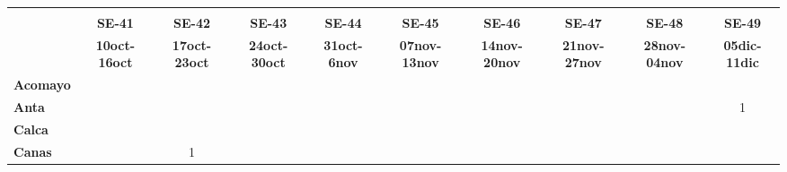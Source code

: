 \begin{tabular}{lccccccccc}
	\textbf{}              & \multicolumn{1}{l}{}                        & \multicolumn{1}{l}{}      & \multicolumn{1}{l}{}                         & \multicolumn{1}{l}{}                         & \multicolumn{1}{l}{}                         & \multicolumn{1}{l}{}                        & \multicolumn{1}{l}{}                         & \multicolumn{1}{l}{}                         & \multicolumn{1}{l}{}     \\
	\textbf{}                                                                                 
	&\textbf{SE-41}                              &\textbf{SE-42}                   &\textbf{SE-43}                  
	&\textbf{SE-44} 
	&\textbf{SE-45} 							&\textbf{SE-46} 
	&\textbf{SE-47}								&\textbf{SE-48}  				  &\textbf{SE-49}\\
		\textbf{}             
	&\textbf{10oct-16oct} 
	&\textbf{17oct-23oct} 						&\textbf{24oct-30oct} 		       &\textbf{31oct-6nov}  						&\textbf{07nov-13nov} 
	&\textbf{14nov-20nov} 						&\textbf{21nov-27nov} 	  		&\textbf{28nov-04nov} 	
	&\textbf{05dic-11dic}\\
	\textbf{Acomayo}                        	
	&\cellcolor[HTML]{FCC46C}                   &\cellcolor[HTML]{FCC46C}          			&\cellcolor[HTML]{FCC46C}                  
	&\cellcolor[HTML]{FCC46C}  			        &\cellcolor[HTML]{FCC46C}          &\cellcolor[HTML]{FCC46C} 					&\cellcolor[HTML]{FCC46C} 	    &\cellcolor[HTML]{FCC46C}
	&\cellcolor[HTML]{FCC46C}\\
	\textbf{Anta}                                                                                   					
	& \cellcolor[HTML]{FCC46C}                  &\cellcolor[HTML]{FCC46C}         &\cellcolor[HTML]{FCC46C} 			    
	& \cellcolor[HTML]{FCC46C} 				    &\cellcolor[HTML]{FCC46C}		  &\cellcolor[HTML]{FCC46C}					&\cellcolor[HTML]{FCC46C}					
	&\cellcolor[HTML]{FCC46C} 					&1\\
	\textbf{Calca}      				       
	&\cellcolor[HTML]{FCC46C}         			&\cellcolor[HTML]{FCC46C}       
	&\cellcolor[HTML]{FCC46C}                   &\cellcolor[HTML]{FCC46C}         &\cellcolor[HTML]{FCC46C}                
	&\cellcolor[HTML]{FCC46C}                   &\cellcolor[HTML]{FCC46C}  		  &\cellcolor[HTML]{FCC46C} 					&\cellcolor[HTML]{FCC46C} 				   \\                										
	\textbf{Canas}                              
	&\cellcolor[HTML]{FCC46C} 					&1        			              			&\cellcolor[HTML]{FCC46C}                   &\cellcolor[HTML]{FCC46C} 					&\cellcolor[HTML]{FCC46C}       			&\cellcolor[HTML]{FCC46C} 

\end{tabular}
